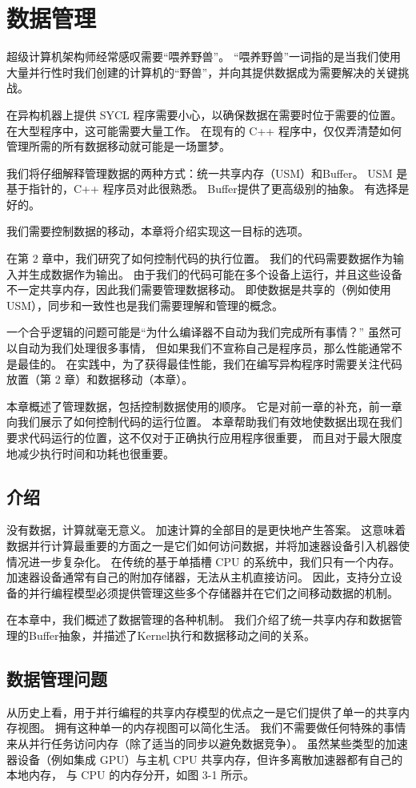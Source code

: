 \section{数据管理}
超级计算机架构师经常感叹需要“喂养野兽”。 
“喂养野兽”一词指的是当我们使用大量并行性时我们创建的计算机的“野兽”，并向其提供数据成为需要解决的关键挑战。

在异构机器上提供 SYCL 程序需要小心，以确保数据在需要时位于需要的位置。 
在大型程序中，这可能需要大量工作。 在现有的 C++ 程序中，仅仅弄清楚如何管理所需的所有数据移动就可能是一场噩梦。

我们将仔细解释管理数据的两种方式：统一共享内存（USM）和Buffer。 
USM 是基于指针的，C++ 程序员对此很熟悉。 Buffer提供了更高级别的抽象。 有选择是好的。

我们需要控制数据的移动，本章将介绍实现这一目标的选项。

在第 2 章中，我们研究了如何控制代码的执行位置。 我们的代码需要数据作为输入并生成数据作为输出。 
由于我们的代码可能在多个设备上运行，并且这些设备不一定共享内存，因此我们需要管理数据移动。 
即使数据是共享的（例如使用 USM），同步和一致性也是我们需要理解和管理的概念。

一个合乎逻辑的问题可能是“为什么编译器不自动为我们完成所有事情？” 虽然可以自动为我们处理很多事情，
但如果我们不宣称自己是程序员，那么性能通常不是最佳的。 
在实践中，为了获得最佳性能，我们在编写异构程序时需要关注代码放置（第 2 章）和数据移动（本章）。

本章概述了管理数据，包括控制数据使用的顺序。 它是对前一章的补充，前一章向我们展示了如何控制代码的运行位置。 
本章帮助我们有效地使数据出现在我们要求代码运行的位置，这不仅对于正确执行应用程序很重要，
而且对于最大限度地减少执行时间和功耗也很重要。


\subsection{介绍}
没有数据，计算就毫无意义。 加速计算的全部目的是更快地产生答案。 
这意味着数据并行计算最重要的方面之一是它们如何访问数据，并将加速器设备引入机器使情况进一步复杂化。 
在传统的基于单插槽 CPU 的系统中，我们只有一个内存。 加速器设备通常有自己的附加存储器，无法从主机直接访问。 
因此，支持分立设备的并行编程模型必须提供管理这些多个存储器并在它们之间移动数据的机制。

在本章中，我们概述了数据管理的各种机制。 
我们介绍了统一共享内存和数据管理的Buffer抽象，并描述了Kernel执行和数据移动之间的关系。

\subsection{数据管理问题}
从历史上看，用于并行编程的共享内存模型的优点之一是它们提供了单一的共享内存视图。 拥有这种单一的内存视图可以简化生活。 
我们不需要做任何特殊的事情来从并行任务访问内存（除了适当的同步以避免数据竞争）。 
虽然某些类型的加速器设备（例如集成 GPU）与主机 CPU 共享内存，但许多离散加速器都有自己的本地内存，
与 CPU 的内存分开，如图 3-1 所示。

